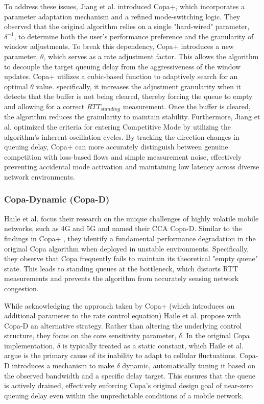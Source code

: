 To address these issues, Jiang et al. \cite{COPAPLUS} introduced Copa+, which incorporates a parameter adaptation mechanism and a refined mode-switching logic. 
They observed that the original algorithm relies on a single "hard-wired" parameter, $\delta^{-1}$, to determine both the user's performance preference and the granularity of window adjustments. 
To break this dependency, Copa+ introduces a new parameter, $\theta$, which serves as a rate adjustment factor. 
This allows the algorithm to decouple the target queuing delay from the aggressiveness of the window updates. 
Copa+ utilizes a cubic-based function to adaptively search for an optimal $\theta$ value.
specifically, it increases the adjustment granularity when it detects that the buffer is not being cleared, thereby forcing the queue to empty and allowing for a correct $RTT_{standing}$ measurement. 
Once the buffer is cleared, the algorithm reduces the granularity to maintain stability. 
Furthermore, Jiang et al. optimized the criteria for entering Competitive Mode by utilizing the algorithm's inherent oscillation cycles. 
By tracking the direction changes in queuing delay, Copa+ can more accurately distinguish between genuine competition with loss-based flows and simple measurement noise, effectively preventing accidental mode activation and maintaining low latency across diverse network environments.

\subsubsection{Copa-Dynamic (Copa-D)}

Haile et al. \cite{COPADYNAMIC} focus their research on the unique challenges of highly volatile mobile networks, such as 4G and 5G and named their \ac{CCA} Copa-D. 
Similar to the findings in Copa+ \cite{COPAPLUS}, they identify a fundamental performance degradation in the original Copa algorithm when deployed in unstable environments\cite{COPADYNAMIC}. 
Specifically, they observe that Copa frequently fails to maintain its theoretical "empty queue" state. 
This leads to standing queues at the bottleneck, which distorts RTT measurements and prevents the algorithm from accurately sensing network congestion.

While acknowledging the approach taken by Copa+ (which introduces an additional parameter to the rate control equation) Haile et al. propose with Copa-D an alternative strategy. 
Rather than altering the underlying control structure, they focus on the core sensitivity parameter, $\delta$.
In the original Copa implementation, $\delta$ is typically treated as a static constant, which Haile et al. argue is the primary cause of its inability to adapt to cellular fluctuations. 
Copa-D introduces a mechanism to make $\delta$ dynamic, automatically tuning it based on the observed bandwidth and a specific delay target. 
This ensures that the queue is actively drained, effectively enforcing Copa's original design goal of near-zero queuing delay even within the unpredictable conditions of a mobile network.

